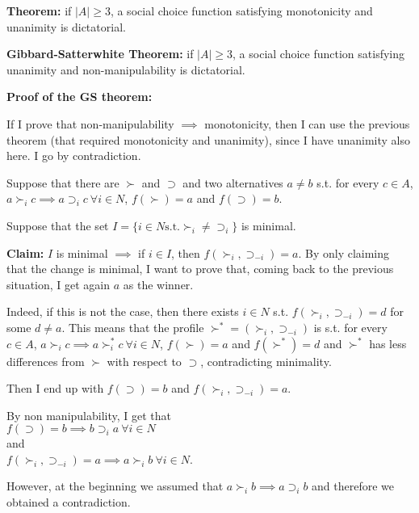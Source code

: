 \bigskip
\noindent \textbf{Theorem:} if $|A| \geq 3$, a social choice function satisfying monotonicity and unanimity is dictatorial.

\bigskip
\noindent \textbf{Gibbard-Satterwhite Theorem:} if $|A| \geq 3$, a social choice function satisfying unanimity and non-manipulability is dictatorial.

\bigskip
\noindent \textbf{Proof of the GS theorem:}

\noindent If I prove that non-manipulability $\implies$ monotonicity, then I can 
use the previous theorem (that required monotonicity and unanimity), since 
I have unanimity also here. I go by contradiction.

\noindent Suppose that there are $\succ$ and $\supset$ and two alternatives $a \neq b$ s.t. for every $c \in A$, $a \succ_i c \implies a \supset_i c ~\forall i \in N$, $f(\succ) = a$ and $f(\supset) = b$.

\noindent Suppose that the set $I = \{i \in N \text{s.t.} \succ_i \neq \supset_i\}$ is minimal.

\noindent \textbf{Claim:} $I$ is minimal $\implies$ if $i \in I$, then $f(\succ_i, \supset_{-i}) = a$. By only claiming that the change is minimal, I want 
to prove that, coming back to the previous situation, I get again $a$ as the 
winner.

\noindent Indeed, if this is not the case, then there exists $i \in N$ s.t. $f(\succ_i, \supset_{-i}) = d$ for some $d \neq a$. This means that the profile $\succ^* = (\succ_i, \supset_{-i})$ is s.t. for every $c \in A$, $a \succ_i c \implies a \succ^*_i c ~\forall i \in N$, $f(\succ) = a$ and $f(\succ^*) = d$ and $\succ^*$ has less differences from $\succ$ with respect to $\supset$, contradicting minimality.

\noindent Then I end up with $f(\supset) = b$ and $f(\succ_i, \supset_{-i}) = a$. 

\noindent By non manipulability, I get that\\
$f(\supset) = b \implies b \supset_i a ~\forall i \in N$\\
and\\ 
$f(\succ_i, \supset_{-i}) = a \implies a \succ_i b ~\forall i \in N$.

\noindent However, at the beginning we assumed that $a \succ_i b \implies a \supset_i b$ and therefore we obtained a contradiction.

%
